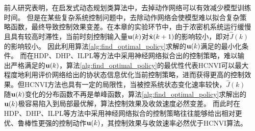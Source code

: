 前人研究表明，在启发式动态规划类算法中，去掉动作网络可以有效减少模型训练时间\cite{Luo2016,Padhi2006}。
但是在某些复杂系统控制问题中，去除动作网络会使模型难以拟合复杂策略函数，最终导致控制效果变差。在本章的实验环节中，由于浓密机系统运行缓慢且具有较高时滞性，当前时刻控制输入量${\mathbf
u}(k)$对$\hat{\mathbf x}(k+1)$的影响较小，即对$\hat{J}(k)$的影响较小。
因此利用算法\ref{alg:find_optimal_policy}求解的${\mathbf
u}(k)$满足的最小化条件。
而在HDP、DHP、ILPL等方法中采用神经网络拟合出的控制策略，难以输出严格满足的${\mathbf
u}(k)$，算法\ref{alg:find_optimal_policy}的最优性代表HCNVI可以最大程度地利用评价网络给出的协状态信息优化当前控制策略，进而获得更高的控制效果。但HCNVI方法也具有一定的局限性，当被控系统状态变化速率较快，$\hat{J}(k)$随${\mathbf
u}(k)$变化的分布函数不再是单峰函数，算法\ref{alg:find_optimal_policy}求解出的${\mathbf
u}(k)$极容易陷入到局部最优解，算法控制效果及收敛速度必然变差。
而此时在HDP、DHP、ILPL等方法中采用神经网络拟合的控制策略往往能够给出相对更优、鲁棒性更强的控制动作${\mathbf
u}(k)$，其控制效果与收敛速率必然优于HCNVI算法。




